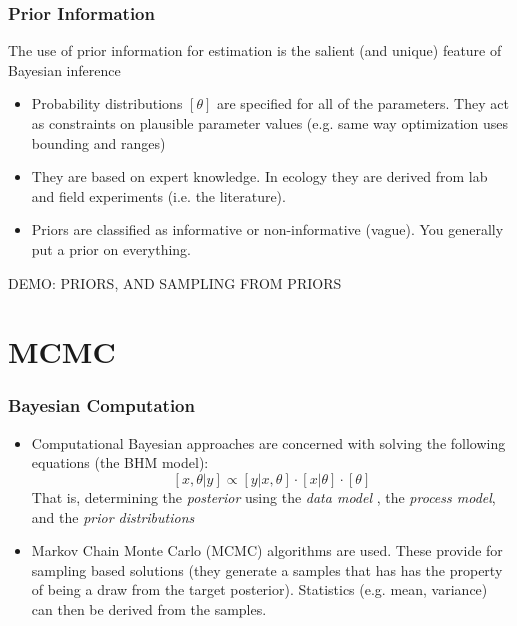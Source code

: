 \documentclass{beamer}
\begin{document}
\frame%
{\frametitle{Prior Information}

The use of prior information for estimation is the salient (and unique) feature of Bayesian inference
\begin{itemize}
\pause
\item
Probability distributions $[\theta]$ are specified for all of the parameters. They act as constraints on plausible parameter values (e.g. same way optimization uses bounding and ranges)
\pause
\item
They are based on expert knowledge. In ecology they are derived from lab and field experiments (i.e. the literature). 
\pause
\item
Priors are classified as informative or non-informative (vague). You generally put a prior on everything. 

\end{itemize}

\pause
\color{red} DEMO: PRIORS, AND SAMPLING FROM PRIORS

}

\section{MCMC}


\frame%
{\frametitle{Bayesian Computation}

\begin{itemize}
\pause
\item
Computational Bayesian approaches are concerned with solving the following equations (the BHM model):
\[
[x,\theta | y] \propto [y | x, \theta] \cdot [x | \theta] \cdot [\theta]
\]
That is, determining the {\it posterior} using the {\it data model} , the {\it process model}, and the {\it prior distributions}
\pause
\item
Markov Chain Monte Carlo (MCMC) algorithms are used. These provide for sampling based solutions (they generate a samples that has has the property of being a draw from the target posterior). Statistics (e.g. mean, variance) can then be derived from the samples.

\end{itemize}

}
\end{document}
